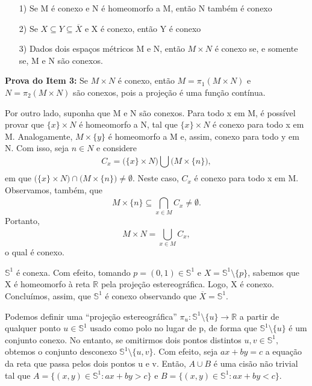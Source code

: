 \documentclass[MetricSpaces/metric_notes.tex]{subfiles}
\begin{document}
\begin{crl*}
	\begin{itemize}
		\item[1)] Se M é conexo e N é homeomorfo a M, então N também é conexo
		\item[2)] Se \(X\subseteq{Y}\subseteq{\overline{X}}\) e X é conexo, então Y é conexo
		\item[3)] Dados dois espaços métricos M e N, então \(M\times N\) é conexo se, e somente se,
		      M e N são conexos.
	\end{itemize}
\end{crl*}
\begin{proof*}
	\textbf{Prova do Item 3:} Se \(M\times N\) é conexo, então \(M = \pi_{1}(M\times N)\) e \(N = \pi_{2}(M\times N)\) são conexos, pois
	a projeção é uma função contínua.

	Por outro lado, suponha que M e N são conexos. Para todo x em M, é possível provar
	que \(\{x\}\times N\) é homeomorfo a N, tal que \(\{x\}\times N\) é conexo para todo x em M. Analogamente, \(M\times\{y\}\) é
	homeomorfo a M e, assim, conexo para todo y em N. Com isso, seja \(n\in N\) e considere
	\[
		C_{x} = \biggl(\{x\}\times N\biggr)\bigcup_{}^{}{\biggl(M\times \{n\}\biggr)},
	\]
	em que \(\biggl(\{x\}\times N\biggr)\cap \biggl(M\times \{n\}\biggr)\neq\emptyset.\) Neste caso, \(C_{x}\) é conexo para todo
	x em M. Observamos, também, que
	\[
		M\times \{n\}\subseteq{\bigcap_{x\in M}^{}{C_{x}}}\neq\emptyset.
	\]
	Portanto,
	\[
		M\times N = \bigcup_{x\in M}^{}{C_{x}},
	\]
	o qual é conexo.\qedsymbol
\end{proof*}
\begin{example}
	\(\mathbb{S}^{1}\) é conexa. Com efeito, tomando \(p = (0, 1)\in \mathbb{S}^{1}\) e \(X = \mathbb{S}^{1}\setminus\{p\}\), sabemos que X é homeomorfo
	à reta \(\mathbb{R}\) pela projeção estereográfica. Logo, X é conexo. Concluímos, assim, que \(\mathbb{S}^{1}\) é conexo observando que
	\(\overline{X} = \mathbb{S}^{1}.\)
\end{example}
\begin{example}
	Podemos definir uma ``projeção estereográfica'' \(\pi_{u}:\mathbb{S}^{1}\setminus\{u\}\rightarrow \mathbb{R}\) a partir de qualquer ponto
	\(u\in \mathbb{S}^{1}\) usado como polo no lugar de p, de forma que \(\mathbb{S}^{1}\setminus\{u\}\) é um conjunto conexo. No entanto, se omitirmos dois pontos distintos \(u, v\in \mathbb{S}^{1},\) obtemos o conjunto
	desconexo \(\mathbb{S}^{1}\setminus\{u, v\}\). Com efeito, seja \(ax + by = c\) a equação da reta que passa
	pelos dois pontos u e v. Então, \(A\cup B\) é uma cisão não trivial tal que \(A = \{(x, y)\in \mathbb{S}^{1}: ax + by > c\}\) e
	\(B = \{(x, y)\in \mathbb{S}^{1}: ax + by < c\}\).
\end{example}
\end{document}
